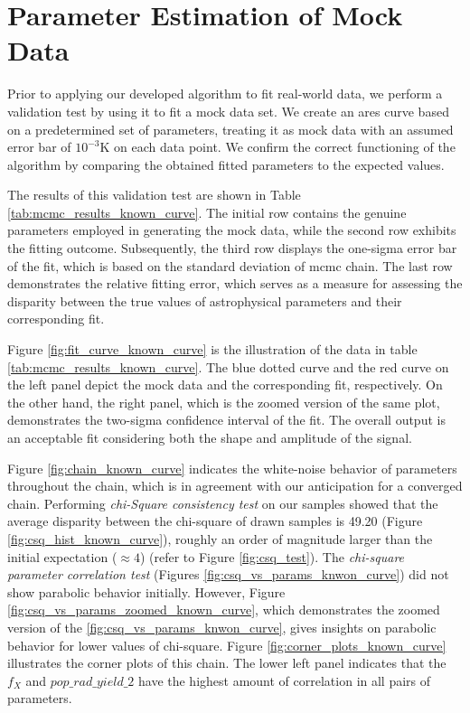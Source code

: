 \documentclass[12pt, TexShade, letterpaper]{report}
\begin{document}
\section{Parameter Estimation of Mock Data}
\label{chap:results,sub:known_curve}
Prior to applying our developed algorithm to fit real-world data, we perform a validation test by using it to fit a mock data set. We create an \gls{ares} curve based on a predetermined set of parameters, treating it as mock data with an assumed error bar of $\mathrm{10^{-3}K}$ on each data point. We confirm the correct functioning of the algorithm by comparing the obtained fitted parameters to the expected values.\par
The results of this validation test are shown in Table \ref{tab:mcmc_results_known_curve}. The initial row contains the genuine parameters employed in generating the mock data, while the second row exhibits the fitting outcome. Subsequently, the third row displays the one-sigma error bar of the fit, which is based on the standard deviation of \gls{mcmc} chain. The last row demonstrates the relative fitting error, which serves as a measure for assessing the disparity between the true values of astrophysical parameters and their corresponding fit.\par 
Figure \ref{fig:fit_curve_known_curve} is the illustration of the data in table \ref{tab:mcmc_results_known_curve}. 
The blue dotted curve and the red curve on the left panel depict the mock data and the corresponding fit, respectively.
On the other hand, the right panel, which is the zoomed version of the same plot, demonstrates the two-sigma confidence interval of the fit. The overall output is an acceptable fit considering both the shape and amplitude of the signal.\par
Figure \ref{fig:chain_known_curve} indicates the white-noise behavior of parameters throughout the chain, which is in agreement with our anticipation for a converged chain. Performing \emph{chi-Square consistency test} on our samples showed that the average disparity between the chi-square of drawn samples is 49.20 (Figure \ref{fig:csq_hist_known_curve}), roughly an order of magnitude larger than the initial expectation ($\approx4$) (refer to Figure \ref{fig:csq_test}). The \emph{chi-square parameter correlation test} (Figures \ref{fig:csq_vs_params_knwon_curve}) did not show parabolic behavior initially. However, Figure \ref{fig:csq_vs_params_zoomed_known_curve}, which demonstrates the zoomed version of the \ref{fig:csq_vs_params_knwon_curve}, gives insights on parabolic behavior for lower values of chi-square. Figure \ref{fig:corner_plots_known_curve} illustrates the corner plots of this chain. The lower left panel indicates that the $f_X$ and $pop\_rad\_ yield\_2$ have the highest amount of correlation in all pairs of parameters.\par
\end{document}
